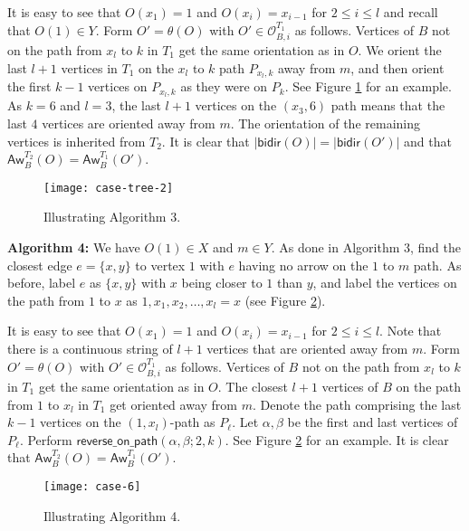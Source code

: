 \documentclass[12pt]{article}
\def\eod{\vrule height 6pt width 5pt depth 0pt}
\newenvironment{proof}{\noindent {\bf Proof:} \hspace{.2em}}
                      {\hspace*{\fill}{\eod}}
\newcommand{\sO}{  \mathcal{ O}}
\newcommand{\revpath}{ \mathsf{reverse\_on\_path}}
\newcommand{\awy}{\mathsf{Aw}}
\newcommand{\bd}{\mathsf{bidir}}
\begin{document}
\begin{proof}
It is easy to see that $O(x_1) = 1$ and $O(x_i) = x_{i-1}$ for $2 \leq i \leq l$ 
and recall that $O(1) \in Y$.  
Form $O' = \theta(O)$ with $O' \in \sO_{B,i}^{T_1}$ as follows.  Vertices 
of $B$ not on the path 
from $x_l$ to $k$ in $T_1$ get the same orientation as in $O$.  
We orient the last $l+1$ vertices in $T_1$ on the $x_l$ to $k$ path 
$P_{x_l,k}$ away from  $m$,
and then orient the first $k-1$ vertices on $P_{x_l,k}$ as they 
were on $P_k$.  See Figure \ref{fig:last_map_example} for an example.   
As $k=6$ and $l=3$, the last $l+1$ vertices on the $(x_3,6)$ path
means that the last $4$ vertices are oriented away from $m$.  The
orientation of the remaining vertices is inherited from $T_2$.
It is clear that 
$|\bd(O)| = |\bd(O')|$ and that 
$\awy_B^{T_2}(O) = \awy_B^{T_1}(O')$.


\begin{figure}[h]
\centerline{\texttt{[image: case-tree-2]}}
\caption{Illustrating Algorithm 3.}
\label{fig:last_map_example}
\end{figure}


\bigskip
\textbf{Algorithm 4:}  We have $O(1) \in X$ and $m \in Y$.  As done in
Algorithm 3, find the closest edge 
$e = \{x,y \}$ to vertex $1$ with $e$ having no arrow
on the $1$ to $m$ path.
As before, label $e$ as $\{x,y\}$ with $x$ being closer to $1$ than $y$, and label
the vertices on the path from $1$ to $x$ as $1,x_1,x_2,\ldots,x_l=x$  (see Figure 
\ref{fig:case6}).

It is easy to see that $O(x_1) = 1$ and $O(x_i) = x_{i-1}$ for $2 \leq i \leq l$. 
Note that there is a continuous string of $l+1$ vertices that are oriented away
from $m$.
Form $O' = \theta(O)$ with 
$O' \in \sO_{B,i}^{T_1}$ as follows.  Vertices of $B$ not on the path from $x_l$ to $k$ 
in $T_1$ get the same orientation as in $O$.  The closest $l+1$ vertices of $B$ on the path 
from $1$ to $x_l$ in $T_1$ get oriented away from $m$.  Denote the path comprising
the last $k-1$ vertices on the $(1, x_l)$-path as $P_{\ell}$.  Let $\alpha, \beta$
be the first and last vertices of $P_{\ell}$.  Perform $\revpath(\alpha, \beta; 2,k)$.
See Figure \ref{fig:case6} for an example.   
It is clear that $\awy_B^{T_2}(O) = \awy_B^{T_1}(O')$. 

\begin{figure}[h]
\centerline{\texttt{[image: case-6]}}
\caption{Illustrating Algorithm 4.}
\label{fig:case6}
\end{figure}





\end{proof}
\end{document}
